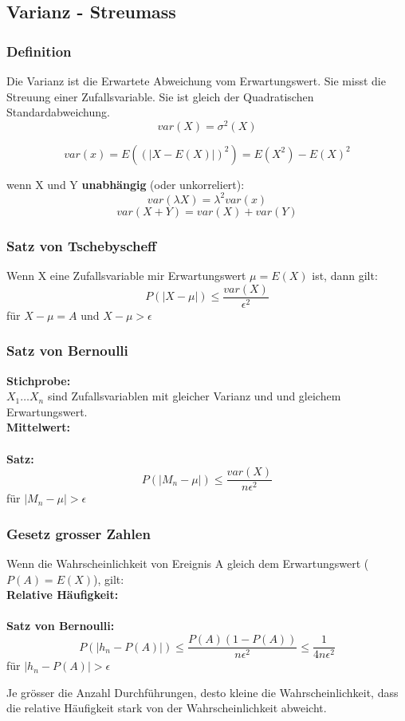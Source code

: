\documentclass[margin=normal]{tex/hsrzf}
\begin{document}
\subsection{Varianz - Streumass}
\begin{multicols}{2}
    \subsubsection*{Definition}
    \noindent Die Varianz ist die Erwartete Abweichung vom Erwartungswert.
    Sie misst die Streuung einer Zufallsvariable. Sie ist gleich der Quadratischen
    Standardabweichung.
    $$var(X) = \sigma^2(X)$$

    $$var(x) = E((|X-E(X)|)^2) = E(X^2) - E(X)^2$$

    wenn X und Y \textbf{unabhängig} (oder unkorreliert):
    $$var(\lambda X) = \lambda^2 var(x)$$
    $$var(X+Y) = var(X) + var(Y)$$

    \subsubsection*{Satz von Tschebyscheff}
    Wenn X eine Zufallsvariable mir Erwartungswert $\mu = E(X)$ ist, dann gilt:
    $$P(|X-\mu|)\leq \frac{var(X)}{\epsilon^2}$$
    für $X-\mu = A$ und $X-\mu > \epsilon$
    \\[10pt]

    \subsubsection*{Satz von Bernoulli}
    \textbf{Stichprobe:}
    \\$X_1 \dots X_n$ sind Zufallsvariablen mit gleicher Varianz und und gleichem Erwartungswert.
        \\ \textbf{Mittelwert:}
        \\ 
        \\ \textbf{Satz:}
        \\$$P(|M_n -\mu|) \leq \frac{var(X)}{n\epsilon^2} $$
        für $|M_n -\mu| > \epsilon$

        \subsubsection*{Gesetz grosser Zahlen}
        Wenn die Wahrscheinlichkeit von Ereignis A gleich dem Erwartungswert ($P(A) = E(X)$), gilt:
        \\ \textbf{Relative Häufigkeit:}
        \\  
        \\ \textbf{Satz von Bernoulli:}
        $$P(|h_n - P(A)|) \leq \frac{P(A)(1-P(A))}{n\epsilon^2} \leq \frac{1}{4n\epsilon^2} $$
        für $|h_n - P(A)| > \epsilon$

    \tiny{Je grösser die Anzahl Durchführungen, desto kleine die Wahrscheinlichkeit, dass die relative Häufigkeit stark von der Wahrscheinlichkeit abweicht.}
\end{multicols}
\end{document}
